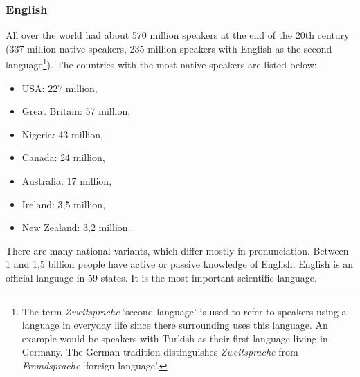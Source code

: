 \subsubsection{English}

All over the world  had about 570 million speakers at the end of the 20th century 
(337 million native speakers, 235 million speakers with English as the second language\footnote{%
  The term \emph{Zweitsprache} `second language' is used to refer to speakers using a language in
  everyday life since there surrounding uses this language. An example would be speakers with
  Turkish as their first language living in Germany. The German tradition distinguishes
  \emph{Zweitsprache} from \emph{Fremdsprache} `foreign language'.%
}). The countries with the most native speakers are listed below: 
\begin{itemize}
\item USA: 227 million,
\item Great Britain: 57 million,
\item Nigeria: 43 million, 
\item Canada: 24 million,
\item Australia: 17 million,
\item Ireland: 3,5 million,
\item New Zealand: 3,2 million.
\end{itemize}
There are many national variants, which differ mostly in pronunciation.
Between 1 and 1,5 billion people have active or passive knowledge of English.
English is an official language in 59 states. It is the most important scientific language.




